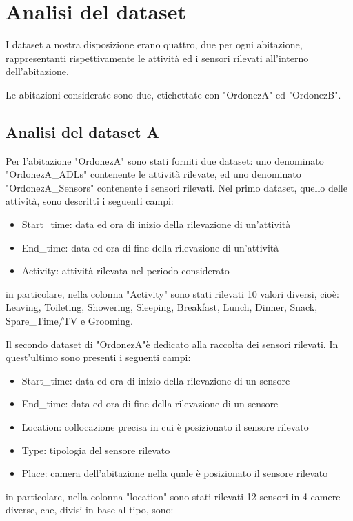 \documentclass[10pt,a4paper]{article}
\begin{document}
	
	\clearpage
	\section{Analisi del dataset}
	I dataset a nostra disposizione erano quattro, due per ogni abitazione, rappresentanti rispettivamente le attività ed i sensori rilevati all'interno dell'abitazione.
	
	Le abitazioni considerate sono due, etichettate con "OrdonezA" ed "OrdonezB".
	\subsection{Analisi del dataset A}
	Per l'abitazione "OrdonezA" sono stati forniti due dataset: uno denominato "OrdonezA\_ADLs" contenente le attività rilevate, ed uno denominato "OrdonezA\_Sensors" contenente i sensori rilevati.
	Nel primo dataset, quello delle attività, sono descritti i seguenti campi:
	\begin{itemize}
		\item Start\_time: data ed ora di inizio della rilevazione di un'attività
		\item End\_time: data ed ora di fine della rilevazione di un'attività
		\item  Activity: attività rilevata nel periodo considerato
	\end{itemize}
	
	in particolare, nella colonna "Activity" sono stati rilevati 10 valori diversi, cioè: Leaving, Toileting, Showering, Sleeping, Breakfast, Lunch, Dinner, Snack, Spare\_Time/TV e Grooming. 
	
	Il secondo dataset di "OrdonezA"è dedicato alla raccolta dei sensori rilevati. In quest'ultimo sono presenti i seguenti campi:
	\begin{itemize}
		\item Start\_time: data ed ora di inizio della rilevazione di un sensore
		\item End\_time: data ed ora di fine della rilevazione di un sensore
		\item  Location: collocazione precisa in cui è posizionato il sensore rilevato
		\item Type: tipologia del sensore rilevato
		\item Place: camera dell'abitazione nella quale è posizionato il sensore rilevato
	\end{itemize}
	
	in particolare, nella colonna "location" sono stati rilevati 12 sensori in 4 camere diverse, che, divisi in base al tipo, sono:
	
\end{document}
